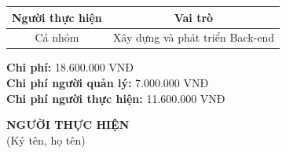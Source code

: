{\begin{minipage}{\textwidth}
\begin{longtable}{|c|c|}
    \hline
    \textbf{Người thực hiện} & \textbf{Vai trò} \\
    \hline
    Cá nhóm & Xây dựng và phát triển Back-end \\
    \hline
    \end{longtable}
    \vspace{0.5cm}
    \noindent \textbf{Chi phí:} 18.600.000 VNĐ \\
    \noindent \textbf{Chi phí người quản lý:} 7.000.000 VNĐ \\
    \noindent \textbf{Chi phí người thực hiện:} 11.600.000 VNĐ \\
    \vspace{1cm}
    \begin{flushleft}
        \hspace{8cm} \textbf{NGƯỜI THỰC HIỆN} \\
        \hspace{8.8cm} (Ký tên, họ tên) \\
        \vspace{1cm}
    \end{flushleft}
    \end{minipage}
}
% 
